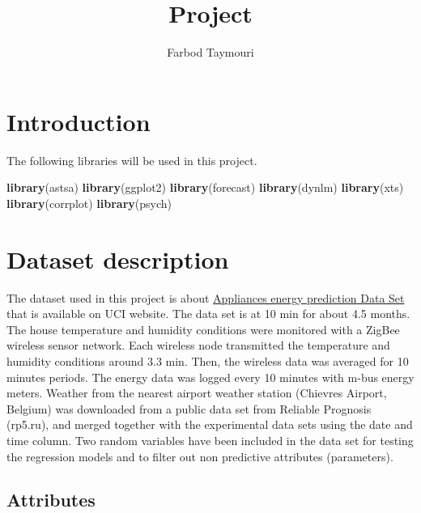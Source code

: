 \documentclass[]{article}
\title{Project}
\author{Farbod Taymouri}
\date{}
\newenvironment{Shaded}{\begin{snugshade}}{\end{snugshade}}
\newcommand{\KeywordTok}[1]{\textcolor[rgb]{0.13,0.29,0.53}{\textbf{#1}}}
\newcommand{\NormalTok}[1]{#1}
\begin{document}
\maketitle

{
\setcounter{tocdepth}{2}
\tableofcontents
}
\section{Introduction}\label{introduction}

The following libraries will be used in this project.

\begin{Shaded}
\begin{Highlighting}[]
\KeywordTok{library}\NormalTok{(astsa)}
\KeywordTok{library}\NormalTok{(ggplot2)}
\KeywordTok{library}\NormalTok{(forecast)}
\KeywordTok{library}\NormalTok{(dynlm)}
\KeywordTok{library}\NormalTok{(xts)}
\KeywordTok{library}\NormalTok{(corrplot)}
\KeywordTok{library}\NormalTok{(psych)}
\end{Highlighting}
\end{Shaded}

\section{Dataset description}\label{dataset-description}

The dataset used in this project is about
\href{https://archive.ics.uci.edu/ml/datasets/Appliances+energy+prediction}{Appliances
energy prediction Data Set} that is available on UCI website. The data
set is at 10 min for about 4.5 months. The house temperature and
humidity conditions were monitored with a ZigBee wireless sensor
network. Each wireless node transmitted the temperature and humidity
conditions around 3.3 min. Then, the wireless data was averaged for 10
minutes periods. The energy data was logged every 10 minutes with m-bus
energy meters. Weather from the nearest airport weather station
(Chievres Airport, Belgium) was downloaded from a public data set from
Reliable Prognosis (rp5.ru), and merged together with the experimental
data sets using the date and time column. Two random variables have been
included in the data set for testing the regression models and to filter
out non predictive attributes (parameters).

\subsection{Attributes}\label{attributes}
\end{document}
